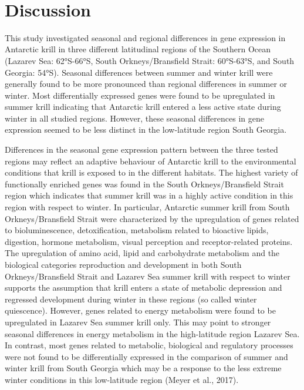 
\section{Discussion}


This study investigated seasonal and regional differences in gene expression in Antarctic krill in three different latitudinal regions of the Southern Ocean (Lazarev Sea: 62°S-66°S, South Orkneys/Bransfield Strait: 60°S-63°S, and South Georgia: 54°S). Seasonal differences between summer and winter krill were generally found to be more pronounced than regional differences in summer or winter. Most differentially expressed genes were found to be upregulated in summer krill indicating that Antarctic krill entered a less active state during winter in all studied regions. However, these seasonal differences in gene expression seemed to be less distinct in the low-latitude region South Georgia.

Differences in the seasonal gene expression pattern between the three tested regions may reflect an adaptive behaviour of Antarctic krill to the environmental conditions that krill is exposed to in the different habitats. The highest variety of functionally enriched genes was found in the South Orkneys/Bransfield Strait region which indicates that summer krill was in a highly active condition in this region with respect to winter. In particular, Antarctic summer krill from South Orkneys/Bransfield Strait were characterized by the upregulation of genes related to bioluminescence, detoxification, metabolism related to bioactive lipids, digestion, hormone metabolism, visual perception and receptor-related proteins. The upregulation of amino acid, lipid and carbohydrate metabolism and the biological categories reproduction and development in both South Orkneys/Bransfield Strait and Lazarev Sea summer krill with respect to winter supports the assumption that krill enters a state of metabolic depression and regressed development during winter in these regions (so called winter quiescence). However, genes related to energy metabolism were found to be upregulated in Lazarev Sea summer krill only. This may point to stronger seasonal differences in energy metabolism in the high-latitude region Lazarev Sea. In contrast, most genes related to metabolic, biological and regulatory processes were not found to be differentially expressed in the comparison of summer and winter krill from South Georgia which may be a response to the less extreme winter conditions in this low-latitude region (Meyer et al., 2017).

